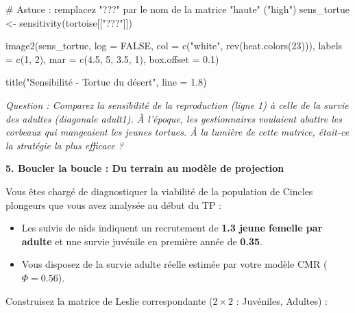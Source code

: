 \documentclass[
  french,
  a4paper,
  DIV=11,
  numbers=noendperiod,
  oneside]{scrreprt}
\newenvironment{Shaded}{}{}
\newcommand{\AttributeTok}[1]{\textcolor[rgb]{0.84,0.23,0.29}{#1}}
\newcommand{\CommentTok}[1]{\textcolor[rgb]{0.42,0.45,0.49}{#1}}
\newcommand{\ConstantTok}[1]{\textcolor[rgb]{0.00,0.36,0.77}{#1}}
\newcommand{\DecValTok}[1]{\textcolor[rgb]{0.00,0.36,0.77}{#1}}
\newcommand{\FloatTok}[1]{\textcolor[rgb]{0.00,0.36,0.77}{#1}}
\newcommand{\FunctionTok}[1]{\textcolor[rgb]{0.44,0.26,0.76}{#1}}
\newcommand{\NormalTok}[1]{\textcolor[rgb]{0.14,0.16,0.18}{#1}}
\newcommand{\OtherTok}[1]{\textcolor[rgb]{0.44,0.26,0.76}{#1}}
\newcommand{\StringTok}[1]{\textcolor[rgb]{0.01,0.18,0.38}{#1}}
\begin{document}
\begin{Shaded}
\begin{Highlighting}[]
\CommentTok{\# Astuce : remplacez "???" par le nom de la matrice "haute" ("high")}
\NormalTok{sens\_tortue }\OtherTok{\textless{}{-}} \FunctionTok{sensitivity}\NormalTok{(tortoise[[}\StringTok{"???"}\NormalTok{]])}

\FunctionTok{image2}\NormalTok{(sens\_tortue, }
       \AttributeTok{log =} \ConstantTok{FALSE}\NormalTok{, }
       \AttributeTok{col =} \FunctionTok{c}\NormalTok{(}\StringTok{"white"}\NormalTok{, }\FunctionTok{rev}\NormalTok{(}\FunctionTok{heat.colors}\NormalTok{(}\DecValTok{23}\NormalTok{))),}
       \AttributeTok{labels =} \FunctionTok{c}\NormalTok{(}\DecValTok{1}\NormalTok{, }\DecValTok{2}\NormalTok{),}
       \AttributeTok{mar =} \FunctionTok{c}\NormalTok{(}\FloatTok{4.5}\NormalTok{, }\DecValTok{5}\NormalTok{, }\FloatTok{3.5}\NormalTok{, }\DecValTok{1}\NormalTok{),}
       \AttributeTok{box.offset =} \FloatTok{0.1}\NormalTok{)}

\FunctionTok{title}\NormalTok{(}\StringTok{"Sensibilité {-} Tortue du désert"}\NormalTok{, }\AttributeTok{line =} \FloatTok{1.8}\NormalTok{)}
\end{Highlighting}
\end{Shaded}

\emph{Question : Comparez la sensibilité de la reproduction (ligne 1) à
celle de la survie des adultes (diagonale adult1). À l'époque, les
gestionnaires voulaient abattre les corbeaux qui mangeaient les jeunes
tortues. À la lumière de cette matrice, était-ce la stratégie la plus
efficace ?}

\textbf{5. Boucler la boucle : Du terrain au modèle de projection}

Vous êtes chargé de diagnostiquer la viabilité de la population de
Cincles plongeurs que vous avez analysée au début du TP :

\begin{itemize}
\item
  Les suivis de nids indiquent un recrutement de \textbf{1.3 jeune
  femelle par adulte} et une survie juvénile en première année de
  \textbf{0.35}.
\item
  Vous disposez de la survie adulte réelle estimée par votre modèle CMR
  (\textbf{\(\Phi = 0.56\)}).
\end{itemize}

Construisez la matrice de Leslie correspondante (\(2 \times 2\) :
Juvéniles, Adultes) :
\end{document}
